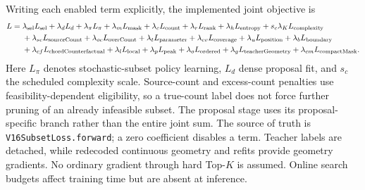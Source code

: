 Writing each enabled term explicitly, the implemented joint objective is
\begin{align}
 L={}&\lambda_{\rm sel}L_{\rm sel}+\lambda_dL_d
 +\lambda_\pi L_\pi+\lambda_mL_{\rm mask}+\lambda_cL_{\rm count}
 +\lambda_rL_{\rm rank}+\lambda_hL_{\rm entropy}
 +s_c\lambda_KL_{\rm complexity}\nonumber\\
 &+\lambda_{sc}L_{\rm sourceCount}+\lambda_{oc}L_{\rm overCount}
 +\lambda_tL_{\rm parameter}+\lambda_{cv}L_{\rm coverage}
 +\lambda_uL_{\rm position}+\lambda_bL_{\rm boundary}\nonumber\\
 &+\lambda_{cf}L_{\rm chordCounterfactual}+\lambda_lL_{\rm local}
 +\lambda_pL_{\rm peak}+\lambda_oL_{\rm ordered}
 +\lambda_gL_{\rm teacherGeometry}+\lambda_{cm}L_{\rm compactMask}.
\end{align}
Here $L_\pi$ denotes stochastic-subset policy learning, $L_d$ dense proposal
fit, and $s_c$ the scheduled complexity scale. Source-count and excess-count
penalties use feasibility-dependent eligibility, so a true-count label does
not force further pruning of an already infeasible subset. The proposal stage
uses its proposal-specific branch rather than the entire joint sum. The source
of truth is \texttt{V16SubsetLoss.forward}; a zero coefficient disables a term.
Teacher labels are detached, while redecoded continuous geometry and refits
provide geometry gradients. No ordinary gradient through hard Top-$K$ is
assumed. Online search budgets affect training time but are absent at inference.
